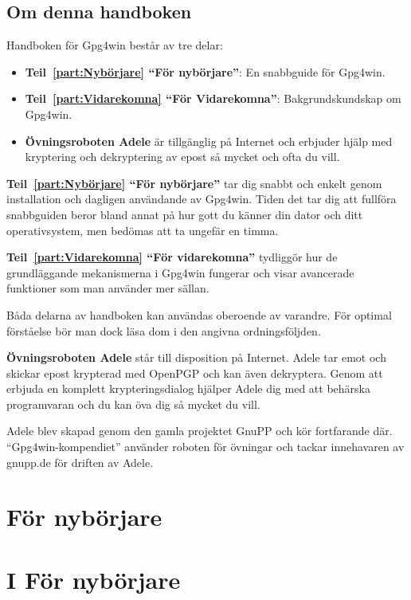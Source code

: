 \documentclass[a4paper,11pt, oneside,openright,titlepage,dvips]{scrbook}
\newcounter{part}
\newcounter{chapter}
\begin{document}
\chapter*{Om denna handboken }

Handboken för Gpg4win består av tre delar:

\begin{itemize}
\item \textbf{Teil~\ref{part:Nybörjare} "`För nybörjare"'}: En
    snabbguide för Gpg4win.

\item \textbf{Teil~\ref{part:Vidarekomna} "`För
    Vidarekomna"'}:
    Bakgrundskundskap om Gpg4win.

\item \textbf{Övningsroboten Adele} är tillgänglig på Internet och erbjuder
  hjälp med kryptering och dekryptering av epost så mycket och ofta du vill.
\end{itemize}

\textbf{Teil~\ref{part:Nybörjare} "`För nybörjare"'} tar dig snabbt och enkelt
genom installation och dagligen användande av Gpg4win. Tiden det tar dig att
fullföra snabbguiden beror bland annat på hur gott du känner din dator och ditt 
operativsystem, men bedömas att ta ungefär en timma.

\textbf{Teil~\ref{part:Vidarekomna} "`För vidarekomna"'} tydliggör hur de 
grundläggande mekanismerna i Gpg4win fungerar och visar avancerade funktioner som
man använder mer sällan.

Båda delarna av handboken kan användas oberoende av varandre. För optimal förståelse
bör man dock läsa dom i den angivna ordningsföljden.

\textbf{Övningsroboten Adele} står till disposition på Internet. Adele tar emot och
skickar epost krypterad med OpenPGP och kan även dekryptera. Genom att erbjuda en
komplett krypteringsdialog hjälper Adele dig med att behärska programvaran och du
kan öva dig så mycket du vill.

Adele blev skapad genom den gamla projektet GnuPP och kör fortfarande där.
"`Gpg4win-kompendiet"' använder roboten för övningar och tackar innehavaren av
gnupp.de för driften av Adele.



\clearpage %

\tableofcontents




\clearpage
{}
\T\part{För nybörjare}
\W\part*{\textbf{I För nybörjare}}
\label{part:nybörjare}
\end{document}
